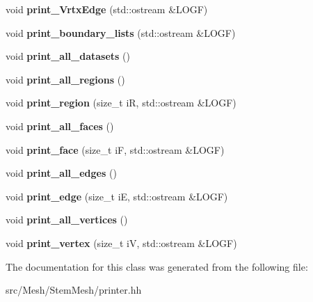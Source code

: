 \begin{DoxyCompactItemize}
void {\bfseries print\+\_\+\+Vrtx\+Edge} (std\+::ostream \&L\+O\+GF)
\item 
\mbox{\label{classStemMesh3D_1_1mesh3Dv__printer_a9acecb2f7d8cc882fbeeed558c96dafa}} 
void {\bfseries print\+\_\+boundary\+\_\+lists} (std\+::ostream \&L\+O\+GF)
\item 
\mbox{\label{classStemMesh3D_1_1mesh3Dv__printer_a15685a631827101e81f9e73b0eb87b22}} 
void {\bfseries print\+\_\+all\+\_\+datasets} ()
\item 
\mbox{\label{classStemMesh3D_1_1mesh3Dv__printer_a632468f55de4627aab05eada804e6a3d}} 
void {\bfseries print\+\_\+all\+\_\+regions} ()
\item 
\mbox{\label{classStemMesh3D_1_1mesh3Dv__printer_aea64117993d28d101debcfb51a26b849}} 
void {\bfseries print\+\_\+region} (size\+\_\+t iR, std\+::ostream \&L\+O\+GF)
\item 
\mbox{\label{classStemMesh3D_1_1mesh3Dv__printer_aeed1308a4db02783d52ba3927bdd2ea7}} 
void {\bfseries print\+\_\+all\+\_\+faces} ()
\item 
\mbox{\label{classStemMesh3D_1_1mesh3Dv__printer_a3336da495be2683022ea12a94d18afc4}} 
void {\bfseries print\+\_\+face} (size\+\_\+t iF, std\+::ostream \&L\+O\+GF)
\item 
\mbox{\label{classStemMesh3D_1_1mesh3Dv__printer_a449ed3d1409dde8bdb7013e41310b659}} 
void {\bfseries print\+\_\+all\+\_\+edges} ()
\item 
\mbox{\label{classStemMesh3D_1_1mesh3Dv__printer_ad4bab96565bc968de82bf2854a8e8c88}} 
void {\bfseries print\+\_\+edge} (size\+\_\+t iE, std\+::ostream \&L\+O\+GF)
\item 
\mbox{\label{classStemMesh3D_1_1mesh3Dv__printer_aeea58049a2b09b4d1f73a2fdcca57d3e}} 
void {\bfseries print\+\_\+all\+\_\+vertices} ()
\item 
\mbox{\label{classStemMesh3D_1_1mesh3Dv__printer_a40deea23c847da8eb426ca737d9fbb1c}} 
void {\bfseries print\+\_\+vertex} (size\+\_\+t iV, std\+::ostream \&L\+O\+GF)
\end{DoxyCompactItemize}


The documentation for this class was generated from the following file\+:\begin{DoxyCompactItemize}
\item 
src/\+Mesh/\+Stem\+Mesh/printer.\+hh\end{DoxyCompactItemize}
